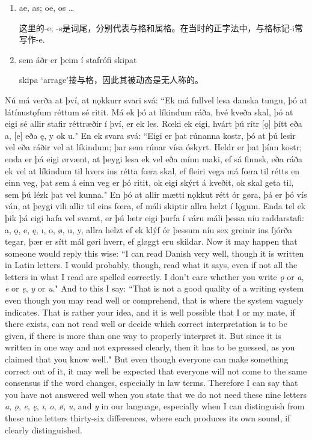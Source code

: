 \begin{grammar*}{}
  \begin{enumerate}[leftmargin=*]
    \item ae, as; oe, os {\dots}

          这里的-e; -s是词尾，分别代表与格和属格。在当时的正字法中，与格标记-i常写作-e.

    \item sem áðr er þeim í stafrófi skipat

          skipa `arrage'接与格，因此其被动态是无人称的。
  \end{enumerate}
\end{grammar*}
\begin{paracol}{2}
  Nú má verða at því, at nǫkkurr svari svá: ``Ek má fullvel lesa danska tungu, þó at látínustǫfum réttum sé ritit. Má ek þó at líkindum ráða, hvé kveða skal, þó at eigi sé allir stafir réttræðir í því, er ek les. Rœki ek eigi, hvárt þú rítr [ǫ] þítt eða a, [e] eða ę, y ok u." En ek svara svá: ``Eigi er þat rúnanna kostr, þó at þú lesir vel eða ráðir vel at líkindum; þar sem rúnar vísa óskyrt. Heldr er þat þínn kostr; enda er þá eigi ørvænt, at þeygi lesa ek vel eða mínn maki, ef sá finnsk, eða ráða ek vel at líkindum til hvers ins rétta fœra skal, ef fleiri vega má fœra til rétts en einn veg, þat sem á einn veg er þó ritit, ok eigi skýrt á kveðit, ok skal geta til, sem þú lézk þat vel kunna." En þó at allir mætti nǫkkut rétt ór gøra, þá er þó vís ván, at þeygi vili allir til eins fœra, ef máli skiptir allra helzt í lǫgum. Enda tel ek þik þá eigi hafa vel svarat, er þú lætr eigi þurfa í váru máli þessa níu raddarstafi: a, ǫ, e, ę, ı, o, ø, u, y, allra helzt ef ek klýf ór þessum níu sex greinir ins fjórða tegar, þær er sítt mál gøri hverr, ef gløggt eru skildar.
  \switchcolumn
  Now it may happen that someone would reply this wise: ``I can read Danish very well, though it is written in Latin letters. I would probably, though, read what it says, even if not all the letters in what I read are spelled correctly. I don't care whether you write \textit{ǫ} or \textit{a}, \textit{e} or \textit{ę}, \textit{y} or \textit{u}." And to this I say: ``That is not a good quality of a writing system even though you may read well or comprehend, that is where the system vaguely indicates. That is rather your idea, and it is well possible that I or my mate, if there exists, can not read well or decide which correct interpretation is to be given, if there is more than one way to properly interpret it. But since it is written in one way and not expressed clearly, then it has to be guessed, as you claimed that you know well." But even though everyone can make something correct out of it, it may well be expected that everyone will not come to the same consensus if the word changes, especially in law terms. Therefore I can say that you have not answered well when you state that we do not need these nine letters \textit{a}, \textit{ǫ}, \textit{e}, \textit{ę}, \textit{ı}, \textit{o}, \textit{ø}, \textit{u}, and \textit{y} in our language, especially when I can distinguish from these nine letters thirty-six differences, where each produces its own sound, if clearly distinguished.
\end{paracol}

